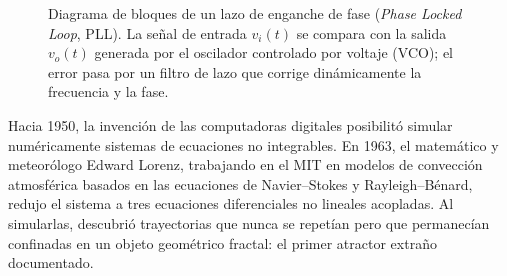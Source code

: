 \begin{figure}[htbp]
\centering
{}
\caption{Diagrama de bloques de un lazo de enganche de fase (\emph{Phase Locked Loop}, PLL). La señal de entrada $v_i(t)$ se compara con la salida $v_o(t)$ generada por el oscilador controlado por voltaje (VCO); el error pasa por un filtro de lazo que corrige dinámicamente la frecuencia y la fase.}
\label{fig:pll_block_diagram}
\end{figure}

Hacia 1950, la invención de las computadoras digitales posibilitó simular numéricamente sistemas de ecuaciones no integrables. En 1963, el matemático y meteorólogo Edward Lorenz, trabajando en el MIT en modelos de convección atmosférica basados en las ecuaciones de Navier--Stokes y Rayleigh--Bénard, redujo el sistema a tres ecuaciones diferenciales no lineales acopladas. Al simularlas, descubrió trayectorias que nunca se repetían pero que permanecían confinadas en un objeto geométrico fractal: el primer atractor extraño documentado.


